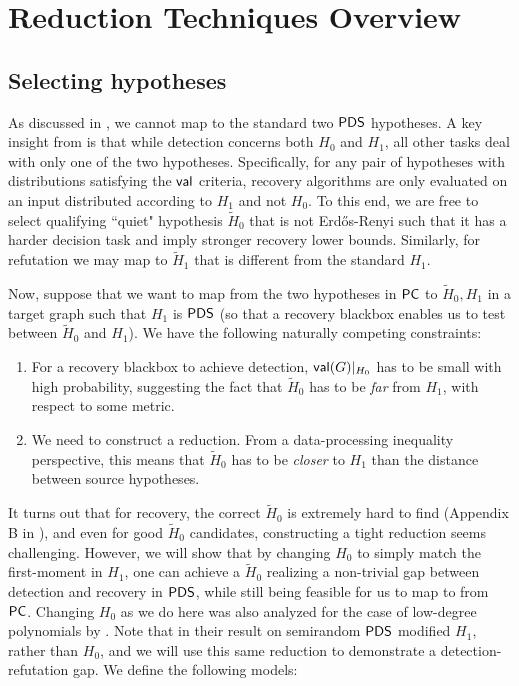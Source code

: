 \documentclass[final,12pt]{colt2023} %
\newcommand\1[1]{\mathbb{I}_{\left\{#1\right\}}}
\begin{document}
\section{Reduction Techniques Overview}
\subsection{Selecting hypotheses}
    As discussed in , we cannot map to the standard two $\mathsf{PDS}$ hypotheses. A key insight from  is that while detection concerns both $H_0$ and $H_1$, all other tasks deal with only one of the two hypotheses. Specifically, for any pair of hypotheses with distributions satisfying the $\mathsf{val}$ criteria, recovery algorithms are only evaluated on an input distributed according to  $H_1$ and not $H_0$. To this end, we are free to select qualifying ``quiet" hypothesis $\tilde H_0$ that is not Erd\H{o}s-Renyi such that it has a harder decision task and imply stronger recovery lower bounds. Similarly, for refutation we may map to $\tilde H_1$ that is different from the standard $H_1$.
    
 Now, suppose that we want to map from the two hypotheses in $\mathsf{PC}$ to $\tilde H_0, H_1$ in a target graph such that $H_1$ is $\mathsf{PDS}$ (so that a recovery blackbox enables us to test between $\tilde H_0$ and $H_1$). We have the following naturally competing constraints:
 \begin{enumerate}
     \item For a recovery blackbox to achieve detection, $\mathsf{val}(G)|_{H_0}$ has to be small with high probability, suggesting the fact that $\tilde H_0$ has to be \emph{far} from $H_1$, with respect to some metric.
     \item We need to construct a reduction. From a data-processing inequality perspective, this means that $\tilde H_0$ has to be \emph{closer} to $H_1$ than the distance between source hypotheses.
 \end{enumerate}
It turns out that for recovery, the correct $\tilde H_0$ is extremely hard to find (Appendix B in \cite{SchrammWein}), and even for good $\tilde H_0$ candidates, constructing a tight reduction seems challenging.
However, we will show that by changing $H_0$ to simply match the first-moment in $H_1$, one can achieve a $\tilde H_0$ realizing a non-trivial gap between detection and recovery in $\mathsf{PDS}$, while still being feasible for us to map to from $\mathsf{PC}$. Changing $H_0$ as we do here was also analyzed for the case of low-degree polynomials by \cite{SchrammWein}. 
Note that \cite{BB20} in their result on semirandom $\mathsf{PDS}$ modified $H_1$, rather than $H_0$, and we will use this same reduction to demonstrate a detection-refutation gap. 
We define the following models:
\end{document}
